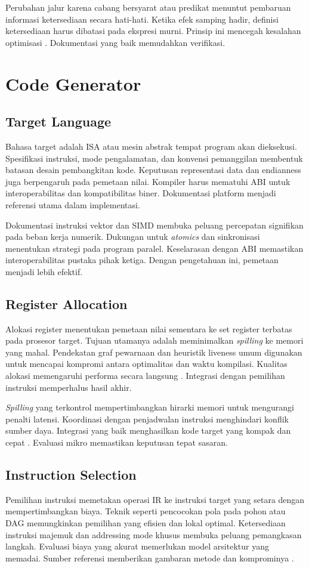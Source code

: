 \documentclass[../main.tex]{subfiles}
\begin{document}
Perubahan jalur karena cabang bersyarat atau predikat menuntut pembaruan informasi ketersediaan secara hati-hati. Ketika efek samping hadir, definisi ketersediaan harus dibatasi pada ekspresi murni. Prinsip ini mencegah kesalahan optimisasi \citep{WikiAvailableExpr}. Dokumentasi yang baik memudahkan verifikasi.

\section{Code Generator}
\subsection{Target Language}
Bahasa target adalah ISA atau mesin abstrak tempat program akan dieksekusi. Spesifikasi instruksi, mode pengalamatan, dan konvensi pemanggilan membentuk batasan desain pembangkitan kode. Keputusan representasi data dan endianness juga berpengaruh pada pemetaan nilai. Kompiler harus mematuhi ABI untuk interoperabilitas dan kompatibilitas biner. Dokumentasi platform menjadi referensi utama dalam implementasi.

Dokumentasi instruksi vektor dan SIMD membuka peluang percepatan signifikan pada beban kerja numerik. Dukungan untuk \emph{atomics} dan sinkronisasi menentukan strategi pada program paralel. Keselarasan dengan ABI memastikan interoperabilitas pustaka pihak ketiga. Dengan pengetahuan ini, pemetaan menjadi lebih efektif.

\subsection{Register Allocation}
Alokasi register menentukan pemetaan nilai sementara ke set register terbatas pada prosesor target. Tujuan utamanya adalah meminimalkan \emph{spilling} ke memori yang mahal. Pendekatan graf pewarnaan dan heuristik liveness umum digunakan untuk mencapai kompromi antara optimalitas dan waktu kompilasi. Kualitas alokasi memengaruhi performa secara langsung \citep{WikiRegisterAllocation}. Integrasi dengan pemilihan instruksi memperhalus hasil akhir.

\emph{Spilling} yang terkontrol mempertimbangkan hirarki memori untuk mengurangi penalti latensi. Koordinasi dengan penjadwalan instruksi menghindari konflik sumber daya. Integrasi yang baik menghasilkan kode target yang kompak dan cepat \citep{WikiRegisterAllocation}. Evaluasi mikro memastikan keputusan tepat sasaran.

\subsection{Instruction Selection}
Pemilihan instruksi memetakan operasi IR ke instruksi target yang setara dengan mempertimbangkan biaya. Teknik seperti pencocokan pola pada pohon atau DAG memungkinkan pemilihan yang efisien dan lokal optimal. Ketersediaan instruksi majemuk dan addressing mode khusus membuka peluang pemangkasan langkah. Evaluasi biaya yang akurat memerlukan model arsitektur yang memadai. Sumber referensi memberikan gambaran metode dan komprominya \citep{WikiInstructionSelection}.
\end{document}
